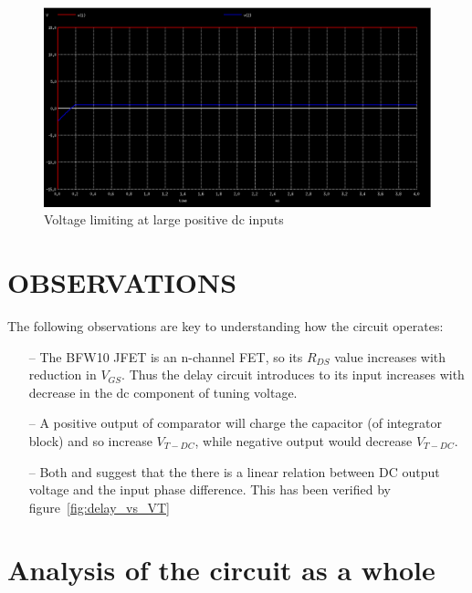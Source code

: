 \documentclass[10pt, conference]{IEEEtran}
\begin{document}
\begin{figure}[bhp]
\centering
\includegraphics[width=\columnwidth]{int_Positive.PNG}
\caption{Voltage limiting at large positive dc inputs}
\label{int_pos}
\end{figure}


\section{OBSERVATIONS}
The following observations are key to understanding how the circuit operates:
\begin{itemize}
    \item [--] The BFW10 JFET is an n-channel FET, so its $R_{DS}$ value increases with reduction in $V_{GS}$. Thus the delay circuit introduces to its input increases with decrease in the dc component of tuning voltage.
    \item [--] A positive output of comparator will charge the capacitor (of integrator block) and so increase $V_{T-DC}$, while negative output would decrease $V_{T-DC}$.
    \item [--] Both \cite{1031521} and  \cite{541607} suggest that the there is a linear relation between DC output voltage and the input phase difference. This has been verified by figure~\ref{fig:delay_vs_VT}
\end{itemize}

\section{Analysis of the circuit as a whole}
\end{document}

